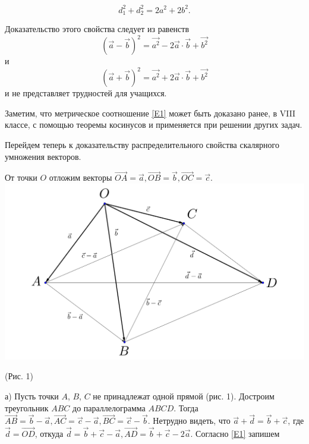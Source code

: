 \documentclass{article}
\begin{document}
\begin{equation} \label{E1}
d_1^2+d_2^2=2a^2+2b^2.
\end{equation}
\par Доказательство этого свойства следует из равенств
\begin{equation} \label{E2}
(\overrightarrow{a}-\overrightarrow{b})^2=\overrightarrow{a^2}-2\overrightarrow{a}\cdot\overrightarrow{b}+\overrightarrow{b^2}
\end{equation}
и
\begin{equation} \label{E3}
(\overrightarrow{a}+\overrightarrow{b})^2=\overrightarrow{a^2}+2\overrightarrow{a}\cdot\overrightarrow{b}+\overrightarrow{b^2}
\end{equation}
и не представляет трудностей для учащихся.
\par Заметим, что метрическое соотношение \eqref{E1} может быть доказано ранее, в VIII классе, с помощью теоремы косинусов и применяется при решении других задач.
\par Перейдем теперь к доказательству распределительного свойства скалярного умножения векторов.
\par От точки $O$ отложим векторы $\overrightarrow{OA}=\overrightarrow{a},\overrightarrow{OB}=\overrightarrow{b},\overrightarrow{OC}=\overrightarrow{c}$.
\\
\includegraphics[scale=0.25]{grigoriev1.png}
\begin{center}
(Рис. 1)
\end{center}
\par а) Пусть точки $A$, $B$, $C$ не принадлежат одной прямой (рис. 1). Достроим треугольник $ABC$ до параллелограмма $ABCD$. Тогда $\overrightarrow{AB}=\overrightarrow{b}-\overrightarrow{a}, \overrightarrow{AC}=\overrightarrow{c}-\overrightarrow{a}, \overrightarrow{BC}=\overrightarrow{c}-\overrightarrow{b}$. Нетрудно видеть, что $\overrightarrow{a}+\overrightarrow{d}=\overrightarrow{b}+\overrightarrow{c}$, где $\overrightarrow{d}=\overrightarrow{OD}$, откуда $\overrightarrow{d}=\overrightarrow{b}+\overrightarrow{c}-\overrightarrow{a}, \overrightarrow{AD}=\overrightarrow{b}+\overrightarrow{c}-2\overrightarrow{a}$. Согласно \eqref{E1} запишем
\end{document}
